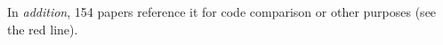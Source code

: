 \documentclass[12pt]{article}
\begin{document}
{%
In \textit{addition}, 154 papers reference it for code comparison or other purposes %
(see the red line).
}
%
\end{document}
